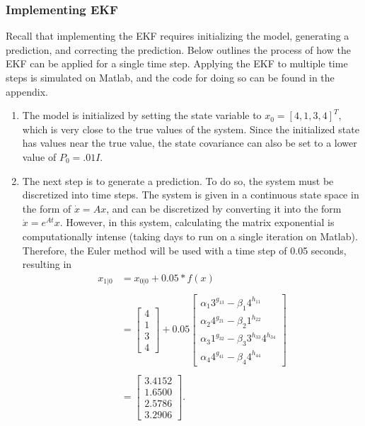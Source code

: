 \clearpage
\subsubsection{Implementing EKF}

Recall that implementing the EKF requires initializing the model, generating a prediction, and correcting the prediction. Below outlines the process of how the EKF can be applied for a single time step. Applying the EKF to multiple time steps is simulated on Matlab, and the code for doing so can be found in the appendix.

\begin{enumerate}
\item The model is initialized by setting the state variable to $x_0 = [4, 1, 3, 4]^T$, which is very close to the true values of the system. Since the initialized state has values near the true value, the state covariance can also be set to a lower value of $P_0 = .01I$. 
\item The next step is to generate a prediction. To do so, the system must be discretized into time steps. The system is given in a continuous state space in the form of $\dot x = Ax$, and can be discretized by converting it into the form $\dot x = e^{At}x$. However, in this system, calculating the matrix exponential is computationally intense (taking days to run on a single iteration on Matlab). Therefore, the Euler method will be used with a time step of 0.05 seconds, resulting in
\begin{align*}
 x_{1|0} &=  x_{0|0} + 0.05  * f(x) \\ \\
&= \begin{bmatrix}
4 \\
1\\
3 \\
4
\end{bmatrix} + 0.05
\begin{bmatrix}
 \alpha_1 3^{g_{13}} - \beta_1 4 ^{h_{11}} \\
 \alpha_2 4^{g_{21}} - \beta_2 1^{h_{22}} \\
 \alpha_3 1^{g_{32}} - \beta_3 3^{h_{33}} 4^{h_{34}} \\
\alpha_4  4^{g_{41}} - \beta_4 4^{h_{44}}
\end{bmatrix} \\ \\
&=\begin{bmatrix}
3.4152 \\
1.6500 \\
2.5786 \\
3.2906
\end{bmatrix}.
\end{align*}


\end{enumerate}
